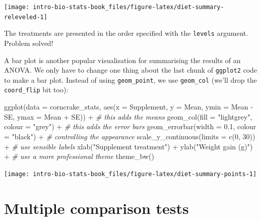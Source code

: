 \documentclass[
]{book}
\newenvironment{Shaded}{\begin{snugshade}}{\end{snugshade}}
\newcommand{\AttributeTok}[1]{\textcolor[rgb]{0.77,0.63,0.00}{#1}}
\newcommand{\CommentTok}[1]{\textcolor[rgb]{0.56,0.35,0.01}{\textit{#1}}}
\newcommand{\DecValTok}[1]{\textcolor[rgb]{0.00,0.00,0.81}{#1}}
\newcommand{\FloatTok}[1]{\textcolor[rgb]{0.00,0.00,0.81}{#1}}
\newcommand{\FunctionTok}[1]{\textcolor[rgb]{0.00,0.00,0.00}{#1}}
\newcommand{\NormalTok}[1]{#1}
\newcommand{\SpecialCharTok}[1]{\textcolor[rgb]{0.00,0.00,0.00}{#1}}
\newcommand{\StringTok}[1]{\textcolor[rgb]{0.31,0.60,0.02}{#1}}
\begin{document}
\begin{center}\texttt{[image: intro-bio-stats-book\_files/figure-latex/diet-summary-releveled-1]} \end{center}

The treatments are presented in the order specified with the \texttt{levels} argument. Problem solved!

A bar plot is another popular visualisation for summarising the results of an ANOVA. We only have to change one thing about the last chunk of \texttt{ggplot2} code to make a bar plot. Instead of using \texttt{geom\_point}, we use \texttt{geom\_col} (we'll drop the \texttt{coord\_flip} bit too):

\begin{Shaded}
\begin{Highlighting}[]
\FunctionTok{ggplot}\NormalTok{(}\AttributeTok{data =}\NormalTok{ corncrake\_stats, }
       \FunctionTok{aes}\NormalTok{(}\AttributeTok{x =}\NormalTok{ Supplement, }\AttributeTok{y =}\NormalTok{ Mean, }\AttributeTok{ymin =}\NormalTok{ Mean }\SpecialCharTok{{-}}\NormalTok{ SE, }\AttributeTok{ymax =}\NormalTok{ Mean }\SpecialCharTok{+}\NormalTok{ SE)) }\SpecialCharTok{+} 
  \CommentTok{\# this adds the means}
  \FunctionTok{geom\_col}\NormalTok{(}\AttributeTok{fill =} \StringTok{"lightgrey"}\NormalTok{, }\AttributeTok{colour =} \StringTok{"grey"}\NormalTok{) }\SpecialCharTok{+} 
  \CommentTok{\# this adds the error bars}
  \FunctionTok{geom\_errorbar}\NormalTok{(}\AttributeTok{width =} \FloatTok{0.1}\NormalTok{, }\AttributeTok{colour =} \StringTok{"black"}\NormalTok{) }\SpecialCharTok{+} 
  \CommentTok{\# controlling the appearance}
  \FunctionTok{scale\_y\_continuous}\NormalTok{(}\AttributeTok{limits =} \FunctionTok{c}\NormalTok{(}\DecValTok{0}\NormalTok{, }\DecValTok{30}\NormalTok{)) }\SpecialCharTok{+} 
  \CommentTok{\# use sensible labels}
  \FunctionTok{xlab}\NormalTok{(}\StringTok{"Supplement treatment"}\NormalTok{) }\SpecialCharTok{+} \FunctionTok{ylab}\NormalTok{(}\StringTok{"Weight gain (g)"}\NormalTok{) }\SpecialCharTok{+} 
  \CommentTok{\# use a more professional theme}
  \FunctionTok{theme\_bw}\NormalTok{()}
\end{Highlighting}
\end{Shaded}

\begin{center}\texttt{[image: intro-bio-stats-book\_files/figure-latex/diet-summary-points-1]} \end{center}

\hypertarget{multiple-comparison-tests-chapter}{%
\chapter{Multiple comparison tests}\label{multiple-comparison-tests-chapter}}
\end{document}

